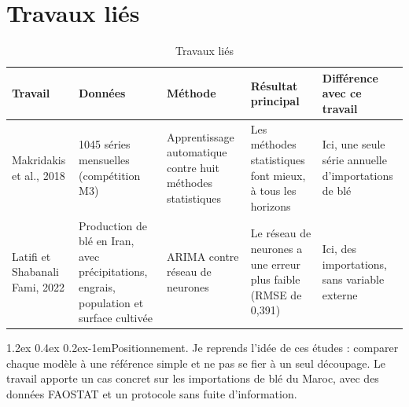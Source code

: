 \documentclass[11pt,a4paper]{article}
\makeatletter
\renewcommand\paragraph{\@startsection{paragraph}{4}{\z@}%
  {1.2ex \@plus 0.4ex \@minus 0.2ex}{-1em}{\normalfont\normalsize\bfseries}}
\makeatother
\begin{document}
\section{Travaux liés}
\label{sec:travaux}
\begin{table}[htbp]
  \centering
  \caption{Travaux liés}
  \label{tab:travaux}
  \small
  \begin{tabular}{@{}P{2.4cm} P{2.8cm} P{2.8cm} P{3.4cm} P{3.8cm}@{}}
    \toprule
    Travail & Données & Méthode & Résultat principal & Différence avec ce travail \\
    \midrule
    Makridakis et al., 2018 \cite{lie1} & 1045 séries mensuelles (compétition M3) & Apprentissage automatique contre huit méthodes statistiques & Les méthodes statistiques font mieux, à tous les horizons & Ici, une seule série annuelle d'importations de blé \\
    Latifi et Shabanali Fami, 2022 \cite{lie2} & Production de blé en Iran, avec précipitations, engrais, population et surface cultivée & ARIMA contre réseau de neurones & Le réseau de neurones a une erreur plus faible (RMSE de 0,391) & Ici, des importations, sans variable externe \\
    \bottomrule
  \end{tabular}
\end{table}

\paragraph{Positionnement.} Je reprends l'idée de ces études : comparer chaque modèle à une référence simple et ne pas se fier à un seul découpage. Le travail apporte un cas concret sur les importations de blé du Maroc, avec des données FAOSTAT et un protocole sans fuite d'information.

\end{document}
